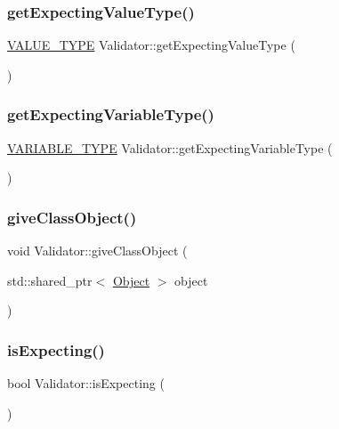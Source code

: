 \subsubsection{\texorpdfstring{get\+Expecting\+Value\+Type()}{getExpectingValueType()}}
{\footnotesize\ttfamily \hyperlink{statics_8h_a0674a913b8e8c8a9f265baab3646b565}{V\+A\+L\+U\+E\+\_\+\+T\+Y\+PE} Validator\+::get\+Expecting\+Value\+Type (\begin{DoxyParamCaption}{ }\end{DoxyParamCaption})}

\mbox{\label{classValidator_a18f11aa871d35f7de943afe80935b660}} 
\subsubsection{\texorpdfstring{get\+Expecting\+Variable\+Type()}{getExpectingVariableType()}}
{\footnotesize\ttfamily \hyperlink{statics_8h_a4c85b3a98d55cc0252806c950379cce0}{V\+A\+R\+I\+A\+B\+L\+E\+\_\+\+T\+Y\+PE} Validator\+::get\+Expecting\+Variable\+Type (\begin{DoxyParamCaption}{ }\end{DoxyParamCaption})}

\mbox{\label{classValidator_ad0a3d5e1c57840006e96c74c74eac0aa}} 
\subsubsection{\texorpdfstring{give\+Class\+Object()}{giveClassObject()}}
{\footnotesize\ttfamily void Validator\+::give\+Class\+Object (\begin{DoxyParamCaption}\item[{std\+::shared\+\_\+ptr$<$ \hyperlink{classObject}{Object} $>$}]{object }\end{DoxyParamCaption})}

\mbox{\label{classValidator_ab94d9925c577be6a8cad24a5a6b60db9}} 
\subsubsection{\texorpdfstring{is\+Expecting()}{isExpecting()}}
{\footnotesize\ttfamily bool Validator\+::is\+Expecting (\begin{DoxyParamCaption}{ }\end{DoxyParamCaption})}

